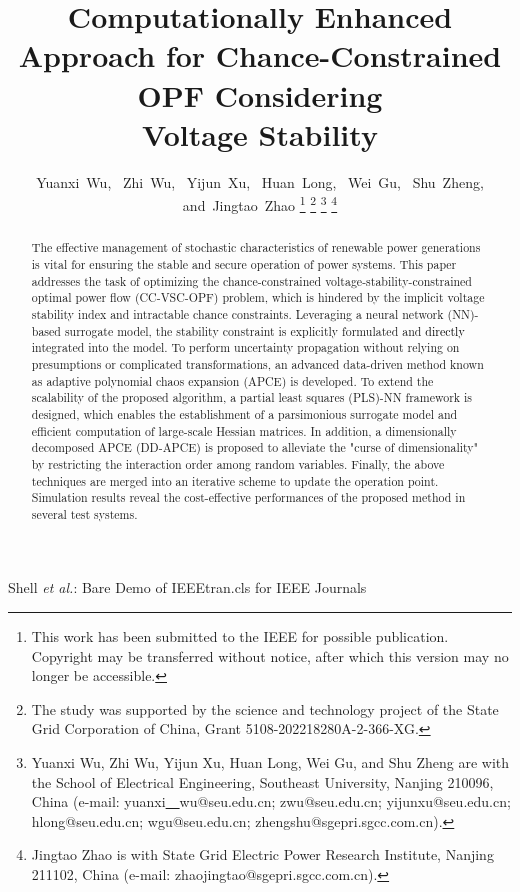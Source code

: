 \documentclass[journal]{IEEEtran}
\theoremstyle{definition}
\theoremstyle{remark}
\begin{document}
\title{Computationally Enhanced Approach for Chance-Constrained OPF Considering \\Voltage Stability}


\author{Yuanxi~Wu,~
        Zhi~Wu,~
        Yijun~Xu,~
        Huan~Long,~
        Wei~Gu,~
        Shu~Zheng,
        and~Jingtao~Zhao%
        \thanks{This work has been submitted to the IEEE for possible publication. Copyright may be transferred without notice, after which this version may no longer be accessible.}
        \thanks{The study was supported by the science and technology project of the State Grid Corporation of China, Grant 5108-202218280A-2-366-XG.}
\thanks{Yuanxi Wu, Zhi Wu, Yijun Xu, Huan Long, Wei Gu, and Shu Zheng are with the School
of Electrical Engineering, Southeast University, Nanjing 210096, China (e-mail: yuanxi\underline{~~}wu@seu.edu.cn; zwu@seu.edu.cn; yijunxu@seu.edu.cn; hlong@seu.edu.cn; wgu@seu.edu.cn; zhengshu@sgepri.sgcc.com.cn).}%
\thanks{Jingtao Zhao is with State Grid Electric Power Research Institute, Nanjing 211102, China (e-mail: zhaojingtao@sgepri.sgcc.com.cn).}%
}

 {Shell \MakeLowercase{\textit{et al.}}: Bare Demo of IEEEtran.cls for IEEE Journals}

\maketitle

\begin{abstract}
The effective management of stochastic characteristics of renewable power generations is vital for ensuring the stable and secure operation of power systems. This paper addresses the task of optimizing the chance-constrained voltage-stability-constrained optimal power flow (CC-VSC-OPF) problem, which is hindered by the implicit voltage stability index and intractable chance constraints.
Leveraging a neural network (NN)-based surrogate model, the stability constraint is explicitly formulated and \textcolor{black}{directly} integrated into the model. To perform uncertainty propagation without relying on presumptions or complicated transformations, an advanced data-driven method known as adaptive polynomial chaos expansion (APCE) is developed. To extend the scalability of the proposed algorithm, a partial least squares (PLS)-NN framework is designed, which enables the establishment of a parsimonious surrogate model and efficient computation of large-scale Hessian matrices. In addition, a dimensionally decomposed APCE (DD-APCE) is proposed to alleviate the "curse of dimensionality" by restricting the interaction order among random variables. Finally, the above techniques are merged into an iterative scheme to update the operation point.
Simulation results reveal the cost-effective performances of the proposed method in several test systems. 
\end{abstract}
\end{document}
